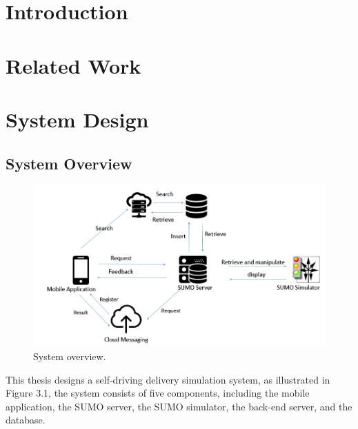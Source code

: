 \documentclass[12pt]{ksthesis}
\begin{document}
\begin{thesis}\large {
\chapter{Introduction} \label{Chap:Introduction}



  


\chapter{Related Work} \label{Chap:Related}




\chapter{System Design}\label{Chap:Architecture}

\section{System Overview}

\begin{figure}[H]
\centering
\includegraphics[width=1.0\textwidth]{./figures/F3-1_SystemOverview.PNG}
\caption{\large System overview.}
\vspace{0.5cm}
\label{Fig:system_Overview}
\end{figure}

This thesis designs a self-driving delivery simulation system, as illustrated in Figure 3.1, the system consists of five components, including the mobile application, the SUMO server, the SUMO simulator, the back-end server, and the database. 

}
\end{thesis}
\end{document}
